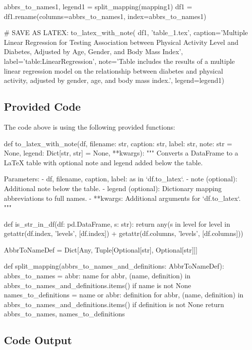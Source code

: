 \documentclass[11pt]{article}
\begin{document}
\begin{python}
abbrs_to_names1, legend1 = split_mapping(mapping1)
df1 = df1.rename(columns=abbrs_to_names1, index=abbrs_to_names1)

# SAVE AS LATEX:
to_latex_with_note(
    df1, 'table_1.tex',
    caption='Multiple Linear Regression for Testing Association between Physical Activity Level and Diabetes, Adjusted by Age, Gender, and Body Mass Index', 
    label='table:LinearRegression',
    note='Table includes the results of a multiple linear regression model on the relationship between diabetes and physical activity, adjusted by gender, age, and body mass index.',
    legend=legend1)


\end{python}

\subsection{Provided Code}
The code above is using the following provided functions:

\begin{python}
def to_latex_with_note(df, filename: str, caption: str, label: str, note: str = None, legend: Dict[str, str] = None, **kwargs):
    """
    Converts a DataFrame to a LaTeX table with optional note and legend added below the table.

    Parameters:
    - df, filename, caption, label: as in `df.to_latex`.
    - note (optional): Additional note below the table.
    - legend (optional): Dictionary mapping abbreviations to full names.
    - **kwargs: Additional arguments for `df.to_latex`.
    """

def is_str_in_df(df: pd.DataFrame, s: str):
    return any(s in level for level in getattr(df.index, 'levels', [df.index]) + getattr(df.columns, 'levels', [df.columns]))

AbbrToNameDef = Dict[Any, Tuple[Optional[str], Optional[str]]]

def split_mapping(abbrs_to_names_and_definitions: AbbrToNameDef):
    abbrs_to_names = {abbr: name for abbr, (name, definition) in abbrs_to_names_and_definitions.items() if name is not None}
    names_to_definitions = {name or abbr: definition for abbr, (name, definition) in abbrs_to_names_and_definitions.items() if definition is not None}
    return abbrs_to_names, names_to_definitions

\end{python}



\subsection{Code Output}
\end{document}
